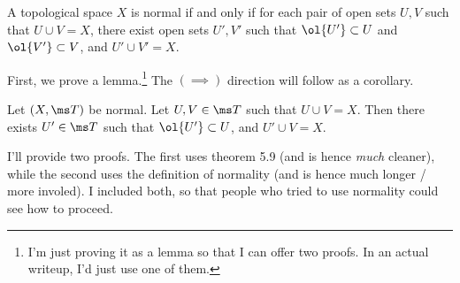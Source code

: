 \documentclass{fkpset}
\begin{document}
  \begin{problem}
    A topological space $X$ is normal if and only if for each pair of
    open sets $U,V$ such that $U \cup V = X$, there exist open sets
    $U', V'$ such that $\ol{U'} \subset U$ and $\ol{V'} \subset V$,
    and $U' \cup V' = X$.
  \end{problem}
  \begin{solution}
    First, we prove a lemma.\footnote{I'm just proving it as a lemma
      so that I can offer two proofs. In an actual writeup, I'd just
      use one of them.} The $(\implies)$ direction will follow as a
    corollary.
    \begin{leftbar}\setcounter{section}{2}\vspace{-.25cm}
      \begin{lemma}
        Let $(X, \ms T)$ be normal. Let $U,V \in \ms T$ such that $U
        \cup V = X$. Then there exists $U' \in \ms T$ such that
        $\ol{U'} \subset U$, and $U' \cup V = X$.
      \end{lemma}

      I'll provide two proofs. The first uses theorem 5.9 (and is
      hence \emph{much} cleaner), while the second uses the definition
      of normality (and is hence much longer / more involed). I
      included both, so that people who tried to use normality could
      see how to proceed.


\end{leftbar}
\end{solution}
\end{document}
